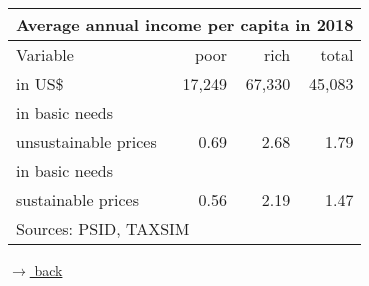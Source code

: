 \documentclass[11pt,aspectratio=169]{beamer}
\begin{document}
	\begin{frame}{}
		\hypertarget{tabIncome}{}
		\vspace{20mm}
		\centering
		\begin{tabular}{l|rrr}
			\multicolumn{4}{c}{\textbf{	Average annual income per capita in 2018}}\\
			\hline \hline
			Variable &poor&   rich&    total\\     
			\hline \hline 
			in US\$  &    17,249&  67,330 &   45,083\\
			\hline
			in basic needs&&&\\
			unsustainable prices  & 0.69     &     2.68   &  1.79\\
			\hline
			in basic needs&&&\\
			sustainable prices& 0.56        &    2.19  & 1.47\\
			\hline \hline
			\multicolumn{4}{l}{\tiny{Sources: PSID, TAXSIM}}
		\end{tabular}
		
		\vspace{13mm}
		\hfill
		\hyperlink{backmodel}{\tiny{$\rightarrow$ back}}
	\end{frame}
	
	
	
	
\end{document}
